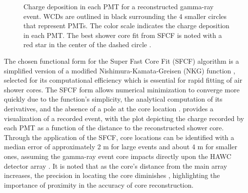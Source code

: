 \begin{figure}
    \caption{Charge deposition in each PMT for a reconstructed gamma-ray event. WCDs are outlined in black surrounding the 4 smaller circles that represent PMTs. The color scale indicates the charge deposition in each PMT. The best shower core fit from SFCF is noted with a red star in the center of the dashed circle \cite{Abeysekara_2017}.}
    \label{fig:core_fitter}
\end{figure}

The chosen functional form for the Super Fast Core Fit (SFCF) algorithm is a simplified version of a modified Nishimura-Kamata-Greisen (NKG) function \cite{cosmic_ray_shape}, selected for its computational efficiency which is essential for rapid fitting of air shower cores.
The SFCF form allows numerical minimization to converge more quickly due to the function's simplicity, the analytical computation of its derivatives, and the absence of a pole at the core location \cite{Abeysekara_2017}.
 provides a visualization of a recorded event, with the plot depicting the charge recorded by each PMT as a function of the distance to the reconstructed shower core.
Through the application of the SFCF, core locations can be identified with a median error of approximately 2 m for large events and about 4 m for smaller ones, assuming the gamma-ray event core impacts directly upon the HAWC detector array \cite{Abeysekara_2017}.
It is noted that as the core's distance from the main array increases, the precision in locating the core diminishes \cite{Abeysekara_2017}, highlighting the importance of proximity in the accuracy of core reconstruction.


